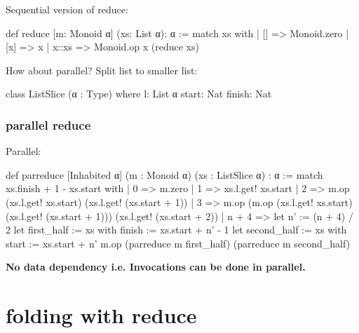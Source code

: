\documentclass{beamer}
\begin{document}
\begin{frame}[fragile]
    Sequential version of \textsf{reduce}:
    \begin{leancode}
        def reduce [m: Monoid α] (xs: List α): α :=
            match xs with
            | [] => Monoid.zero
            | [x] => x
            | x::xs => Monoid.op x (reduce xs)
    \end{leancode}
    How about parallel?
    Split list to smaller list:
    \begin{leancode}
        class ListSlice (α : Type) where
            l: List α
            start: Nat
            finish: Nat
    \end{leancode}
\end{frame}
\begin{frame}[fragile]
    \frametitle{parallel reduce}
    Parallel:
\begin{leancode}
def parreduce [Inhabited α] (m : Monoid α) (xs : ListSlice α) : α :=
    match xs.finish + 1 - xs.start with
    | 0 => m.zero
    | 1 => xs.l.get! xs.start
    | 2 => m.op (xs.l.get! xs.start) (xs.l.get! (xs.start + 1))
    | 3 =>
        m.op
            (m.op (xs.l.get! xs.start) (xs.l.get! (xs.start + 1)))
            (xs.l.get! (xs.start + 2))
    | n + 4 =>
        let n' := (n + 4) / 2
        let first_half := {xs with finish := xs.start + n' - 1}
        let second_half := {xs with start := xs.start + n'}
        m.op
            (parreduce m first_half)
            (parreduce m second_half)
\end{leancode}
    \textbf{No data dependency i.e. Invocations can be done in parallel.}
\end{frame}
\section{folding with reduce}
\end{document}
